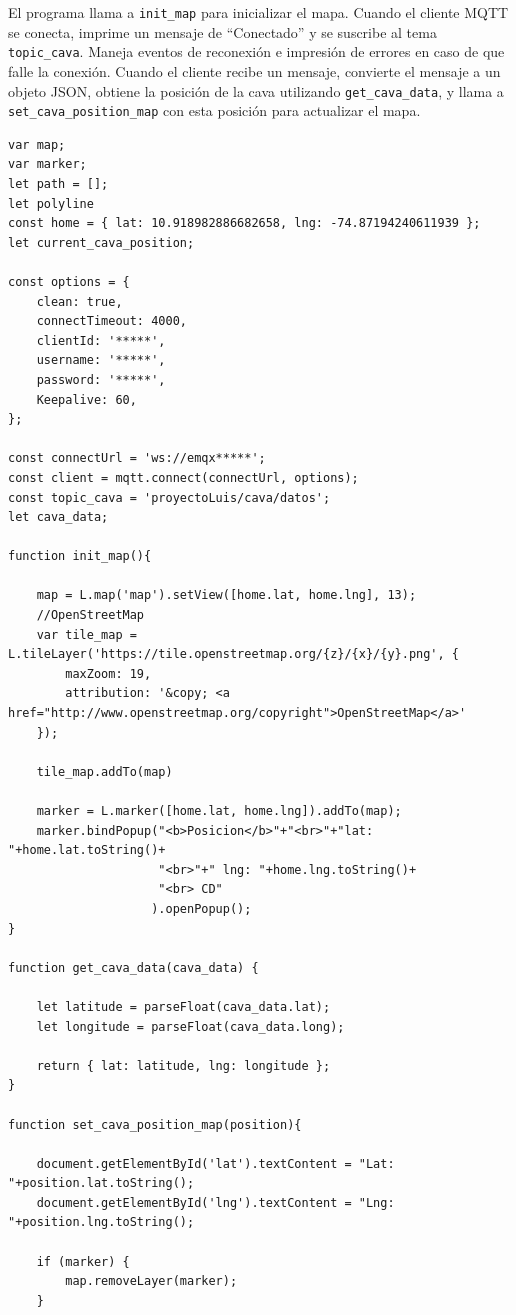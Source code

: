 El programa llama a \verb|init_map| para inicializar el mapa. Cuando el cliente MQTT se conecta, imprime un mensaje de ``Conectado'' y se suscribe al tema \verb|topic_cava|. Maneja eventos de reconexión e impresión de errores en caso de que falle la conexión. Cuando el cliente recibe un mensaje, convierte el mensaje a un objeto JSON, obtiene la posición de la cava utilizando \verb|get_cava_data|, y llama a \verb|set_cava_position_map| con esta posición para actualizar el mapa.


\begin{lstlisting}
var map;
var marker;
let path = [];
let polyline
const home = { lat: 10.918982886682658, lng: -74.87194240611939 };
let current_cava_position;

const options = {
    clean: true, 
    connectTimeout: 4000, 
    clientId: '*****',
    username: '*****',
    password: '*****',
    Keepalive: 60,
};

const connectUrl = 'ws://emqx*****';
const client = mqtt.connect(connectUrl, options);
const topic_cava = 'proyectoLuis/cava/datos';
let cava_data;

function init_map(){
    
    map = L.map('map').setView([home.lat, home.lng], 13);
    //OpenStreetMap 
    var tile_map = L.tileLayer('https://tile.openstreetmap.org/{z}/{x}/{y}.png', {
        maxZoom: 19,
        attribution: '&copy; <a href="http://www.openstreetmap.org/copyright">OpenStreetMap</a>'
    });

    tile_map.addTo(map)

    marker = L.marker([home.lat, home.lng]).addTo(map);
    marker.bindPopup("<b>Posicion</b>"+"<br>"+"lat: "+home.lat.toString()+
                     "<br>"+" lng: "+home.lng.toString()+
                     "<br> CD"
                    ).openPopup();
}

function get_cava_data(cava_data) {

    let latitude = parseFloat(cava_data.lat);
    let longitude = parseFloat(cava_data.long);

    return { lat: latitude, lng: longitude };
}

function set_cava_position_map(position){
    
    document.getElementById('lat').textContent = "Lat: "+position.lat.toString();
    document.getElementById('lng').textContent = "Lng: "+position.lng.toString();
    
    if (marker) {
        map.removeLayer(marker);
    }


\end{lstlisting}

